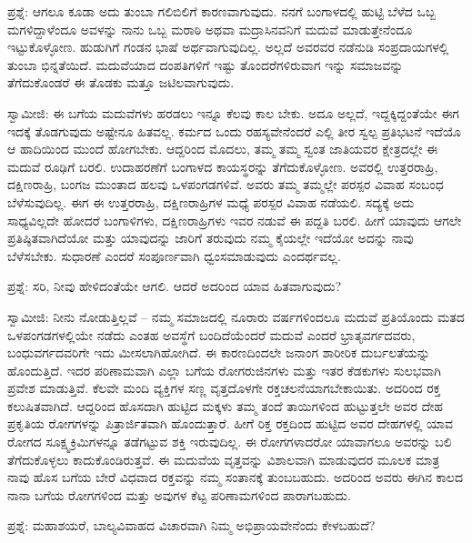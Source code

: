 ಪ್ರಶ್ನೆ: ಆಗಲೂ ಕೂಡಾ ಅದು ತುಂಬಾ ಗಲಿಬಿಲಿಗೆ ಕಾರಣವಾಗುವುದು. ನನಗೆ ಬಂಗಾಳದಲ್ಲಿ ಹುಟ್ಟಿ ಬೆಳೆದ ಒಬ್ಬ ಮಗಳಿದ್ದಾಳೆಂದೂ ಅವಳನ್ನು ನಾನು ಒಬ್ಬ ಮರಾಠಿ ಅಥವಾ ಮದ್ರಾಸಿನವನಿಗೆ ಮದುವೆ ಮಾಡುತ್ತೇನೆಂದೂ ಇಟ್ಟುಕೊಳ್ಳೋಣ. ಹುಡುಗಿಗೆ ಗಂಡನ ಭಾಷೆ ಅರ್ಥವಾಗುವುದಿಲ್ಲ. ಅಲ್ಲದೆ ಅವರವರ ನಡೆನುಡಿ ಸಂಪ್ರದಾಯಗಳಲ್ಲಿ ತುಂಬಾ ಭಿನ್ನತೆಯಿದೆ. ಮದುವೆಯಾದ ದಂಪತಿಗಳಿಗೆ ಇಷ್ಟು ತೊಂದರೆಗಳಿರುವಾಗ ಇನ್ನು ಸಮಾಜವನ್ನು ತೆಗೆದುಕೊಂಡರೆ ಈ ತೊಡಕು ಮತ್ತೂ ಜಟಿಲವಾಗುವುದು.

ಸ್ವಾಮೀಜಿ: ಈ ಬಗೆಯ ಮದುವೆಗಳು ಹರಡಲು ಇನ್ನೂ ಕೆಲವು ಕಾಲ ಬೇಕು. ಅದೂ ಅಲ್ಲದೆ, ಇದ್ದಕ್ಕಿದ್ದಂತೆಯೇ ಈಗ ಇದಕ್ಕೆ ತೊಡಗುವುದು ಅಷ್ಟೇನೂ ಹಿತವಲ್ಲ. ಕರ್ಮದ ಒಂದು ರಹಸ್ಯವೇನೆಂದರೆ ಎಲ್ಲಿ ತೀರ ಸ್ವಲ್ಪ ಪ್ರತಿಭಟನೆ ಇದೆಯೊ ಆ ಹಾದಿಯಿಂದ ಮುಂದೆ ಹೋಗಬೇಕು. ಆದ್ದರಿಂದ ಮೊದಲು, ತಮ್ಮ ತಮ್ಮ ಸ್ವಂತ ಜಾತಿಯವರ ಕ್ಷೇತ್ರದಲ್ಲೇ ಈ ಮದುವೆ ರೂಢಿಗೆ ಬರಲಿ. ಉದಾಹರಣೆಗೆ ಬಂಗಾಳದ ಕಾಯಸ್ಥರನ್ನು ತೆಗೆದುಕೊಳ್ಳೋಣ. ಅವರಲ್ಲಿ ಉತ್ತರರಾಹ್ರಿ, ದಕ್ಷಿಣರಾಹ್ರಿ, ಬಂಗಜ ಮುಂತಾದ ಹಲವು ಒಳಪಂಗಡಗಳಿವೆ. ಅವರು ತಮ್ಮ ತಮ್ಮಲ್ಲೇ ಪರಸ್ಪರ ವಿವಾಹ ಸಂಬಂಧ ಬೆಳೆಸುವುದಿಲ್ಲ. ಈಗ ಈ ಉತ್ತರರಾಹ್ರಿ, ದಕ್ಷಿಣರಾಹ್ರಿಗಳ ಮಧ್ಯೆ ಪರಸ್ಪರ ವಿವಾಹ ನಡೆಯಲಿ. ಸದ್ಯಕ್ಕೆ ಅದು ಸಾಧ್ಯವಿಲ್ಲದೇ ಹೋದರೆ ಬಂಗಾಳಿಗಳು, ದಕ್ಷಿಣರಾಹ್ರಿಗಳು ಇವರ ನಡುವೆ ಈ ಪದ್ದತಿ ಬರಲಿ. ಹೀಗೆ ಯಾವುದು ಆಗಲೇ ಪ್ರತಿಷ್ಠಿತವಾಗಿದೆಯೋ ಮತ್ತು ಯಾವುದನ್ನು ಜಾರಿಗೆ ತರುವುದು ನಮ್ಮ ಕೈಯಲ್ಲೇ ಇದೆಯೋ ಅದನ್ನು ನಾವು ಬೆಳೆಸಬೇಕು. ಸುಧಾರಣೆ ಎಂದರೆ ಸಂಪೂರ್ಣವಾಗಿ ಧ್ವಂಸಮಾಡುವುದು ಎಂದರ್ಥವಲ್ಲ.

ಪ್ರಶ್ನೆ: ಸರಿ, ನೀವು ಹೇಳಿದಂತೆಯೇ ಆಗಲಿ. ಆದರೆ ಅದರಿಂದ ಯಾವ ಹಿತವಾಗುವುದು?

ಸ್ವಾಮೀಜಿ: ನೀನು ನೋಡುತ್ತಿಲ್ಲವೆ – ನಮ್ಮ ಸಮಾಜದಲ್ಲಿ ನೂರಾರು ವರ್ಷಗಳಿಂದಲೂ ಮದುವೆ ಪ್ರತಿಯೊಂದು ಮತದ ಒಳಪಂಗಡಗಳಲ್ಲಿಯೇ ನಡೆದು ಎಂತಹ ಅವಸ್ಥೆಗೆ ಬಂದಿದೆಯೆಂದರೆ ಮದುವೆ ಎಂದರೆ ಭ್ರಾತೃವರ್ಗದವರು, ಬಂಧುವರ್ಗದವರಿಗೇ ಇದು ಮೀಸಲಾಗಿಹೋಗಿದೆ. ಈ ಕಾರಣದಿಂದಲೇ ಜನಾಂಗ ಶಾರೀರಿಕ ದುರ್ಬಲತೆಯನ್ನು ಹೊಂದುತ್ತಿದೆ. ಇದರ ಪರಿಣಾಮವಾಗಿ ಎಲ್ಲಾ ಬಗೆಯ ರೋಗರುಜಿನಗಳು ಮತ್ತು ಇತರ ಕೆಡಕುಗಳು ಸುಲಭವಾಗಿ ಪ್ರವೇಶ ಮಾಡುತ್ತಿವೆ. ಕೆಲವೇ ಮಂದಿ ವ್ಯಕ್ತಿಗಳ ಸಣ್ಣ ವೃತ್ತದೊಳಗೇ ರಕ್ತಚಲನೆಯಾಗಬೇಕಾಯಿತು. ಅದರಿಂದ ರಕ್ತ ಕಲುಷಿತವಾಗಿದೆ. ಆದ್ದರಿಂದ ಹೊಸದಾಗಿ ಹುಟ್ಟಿದ ಮಕ್ಕಳು ತಮ್ಮ ತಂದೆ ತಾಯಿಗಳಿಂದ ಹುಟ್ಟುತ್ತಲೇ ಅವರ ದೇಹ ಪ್ರಕೃತಿಯ ರೋಗಗಳನ್ನು ಪಿತ್ರಾರ್ಜಿತವಾಗಿ ಹೊಂದುತ್ತಾರೆ. ಹೀಗೆ ರಿಕ್ತ ರಕ್ತದಿಂದ ಹುಟ್ಟಿದ ಅವರ ದೇಹಗಳಲ್ಲಿ ಯಾವ ರೋಗದ ಸೂಕ್ಷ್ಮಕ್ರಿಮಿಗಳನ್ನೂ ತಡೆಗಟ್ಟುವ ಶಕ್ತಿ ಇರುವುದಿಲ್ಲ. ಈ ರೋಗಗಳಾದರೋ ಯಾವಾಗಲೂ ಅವರನ್ನು ಬಲಿ ತೆಗೆದುಕೊಳ್ಳಲು ಕಾದುಕೊಂಡಿರುತ್ತವೆ. ಈ ಮದುವೆಯ ವೃತ್ತವನ್ನು ವಿಶಾಲವಾಗಿ ಮಾಡುವುದರ ಮೂಲಕ ಮಾತ್ರ ನಾವು ಹೊಸ ಬಗೆಯ ಬೇರೆ ವಿಧವಾದ ರಕ್ತವನ್ನು ನಮ್ಮ ಸಂತಾನಕ್ಕೆ ತುಂಬಬಹುದು. ಅದರಿಂದ ಅವರು ಈಗಿನ ಕಾಲದ ನಾನಾ ಬಗೆಯ ರೋಗಗಳಿಂದ ಮತ್ತು ಅವುಗಳ ಕೆಟ್ಟ ಪರಿಣಾಮಗಳಿಂದ ಪಾರಾಗಬಹುದು.

ಪ್ರಶ್ನೆ: ಮಹಾಶಯರೆ, ಬಾಲ್ಯವಿವಾಹದ ವಿಚಾರವಾಗಿ ನಿಮ್ಮ ಅಭಿಪ್ರಾಯವೇನೆಂದು ಕೇಳಬಹುದೆ?

